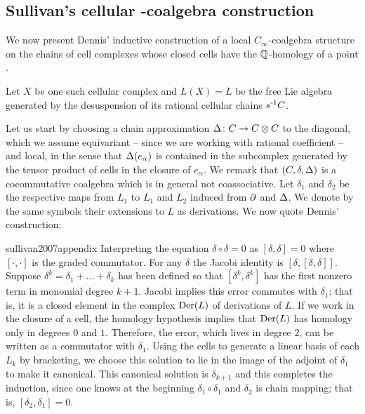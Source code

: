 \subsection{Sullivan's cellular \pdfCinfty-coalgebra construction} \label{ss:dennis construction}

We now present Dennis' inductive construction of a local $C_\infty$-coalgebra structure on the chains of cell complexes whose closed cells have the $\mathbb{Q}$-homology of a point \cite{sullivan2007appendix}.

Let $X$ be one such cellular complex and $L(X) = L$ be the free Lie algebra generated by the desuspension of its rational cellular chains $s^{\mbox{\scriptsize -1}}C$.

Let us start by choosing a chain approximation $\operatorname{\Delta} \colon C \to C \otimes C$ to the diagonal, which we assume equivariant -- since we are working with rational coefficient -- and local, in the sense that $\operatorname{\Delta}(e_\alpha)$ is contained in the subcomplex generated by the tensor product of cells in the closure of $e_\alpha$.
We remark that $(C, \delta, \operatorname{\Delta})$ is a cocommutative coalgebra which is in general not coassociative.
Let $\delta_1$ and $\delta_2$ be the respective maps from $L_1$ to $L_1$ and $L_2$ induced from $\operatorname{\partial}$ and $\operatorname{\Delta}$.
We denote by the same symbols their extensions to $L$ as derivations.
We now quote Dennis' construction:

\begin{displaycquote}[p.251]{sullivan2007appendix}
	Interpreting the equation $\delta \circ \delta = 0$ as $[\delta, \delta] = 0$ where $[\cdot, \cdot]$ is the graded commutator.
	For any $\delta$ the Jacobi identity is $[\delta, [\delta, \delta]]$.
	Suppose $\delta^k = \delta_1 + \dots + \delta_k$ has been defined so that $[\delta^k, \delta^k]$ has the first nonzero term in monomial degree $k + 1$.
	Jacobi implies this error commutes with $\delta_1$; that is, it is a closed element in the complex $\mathrm{Der}(L)$ of derivations of $L$.
	If we work in the closure of a cell, the homology hypothesis implies that $\mathrm{Der}(L)$ has homology only in degrees $0$ and $1$.
	Therefore, the error, which lives in degree $2$, can be written as a commutator with $\delta_1$.
	Using the cells to generate a linear basis of each $L_k$ by bracketing, we choose this solution to lie in the image of the adjoint of $\delta_1$ to make it canonical.
	This canonical solution is $\delta_{k+1}$ and this completes the induction, since one knows at the beginning $\delta_1 \circ \delta_1$
	and $\delta_2$ is chain mapping; that is, $[\delta_2, \delta_1] = 0$.
\end{displaycquote}

